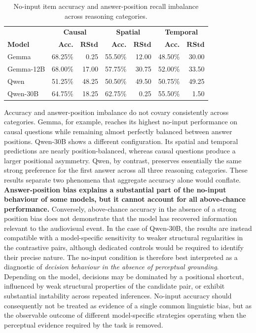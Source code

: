 \begin{table}[ht]
    \centering
    \small
    \begin{tabular}{lrrrrrr}
        \hline
        & \multicolumn{2}{c}{\textbf{Causal}}
        & \multicolumn{2}{c}{\textbf{Spatial}}
        & \multicolumn{2}{c}{\textbf{Temporal}} \\
        \textbf{Model}
        & \textbf{Acc.} & $\mathbf{RStd}$
        & \textbf{Acc.} & $\mathbf{RStd}$
        & \textbf{Acc.} & $\mathbf{RStd}$ \\
        \hline
        Gemma
        & 68.25\% & 0.25
        & 55.50\% & 12.00
        & 48.50\% & 30.00 \\
        Gemma-12B
        & 68.00\% & 17.00
        & 57.75\% & 30.75
        & 52.00\% & 33.50 \\
        Qwen
        & 51.25\% & 48.25
        & 50.50\% & 49.50
        & 50.75\% & 49.25 \\
        Qwen-30B
        & 64.75\% & 18.25
        & 62.75\% & 0.25
        & 55.50\% & 1.50 \\
        \hline
    \end{tabular}
    \caption{No-input item accuracy and answer-position recall imbalance
    across reasoning categories.}
    \label{tab:no_input_categories_bias}
\end{table}
Accuracy and answer-position imbalance do not covary consistently across
categories. Gemma, for example, reaches its highest no-input performance on
causal questions while remaining almost perfectly balanced between answer
positions. Qwen-30B shows a different configuration. Its spatial and temporal
predictions are nearly position-balanced, whereas causal questions produce a
larger positional asymmetry. Qwen, by contrast, preserves essentially the same
strong preference for the first answer across all three reasoning categories.
These results separate two phenomena that aggregate accuracy alone would
conflate. \textbf{Answer-position bias explains a substantial part of the
no-input behaviour of some models, but it cannot account for all above-chance
performance.} Conversely, above-chance accuracy in the absence of a strong
position bias does not demonstrate that the model has recovered information
relevant to the audiovisual event. In the case of Qwen-30B, the results are
instead compatible with a model-specific sensitivity to weaker structural
regularities in the contrastive pairs, although dedicated controls would be
required to identify their precise nature.
The no-input condition is therefore best interpreted as a diagnostic of
\emph{decision behaviour in the absence of perceptual grounding}. Depending on
the model, decisions may be dominated by a positional shortcut, influenced by
weak structural properties of the candidate pair, or exhibit substantial
instability across repeated inferences. No-input accuracy should consequently
not be treated as evidence of a single common linguistic bias, but as the
observable outcome of different model-specific strategies operating when the
perceptual evidence required by the task is removed.

